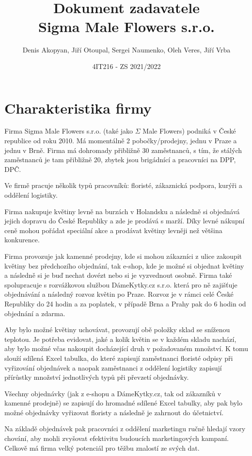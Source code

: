 \documentclass{article}
\title{Dokument zadavatele \\ Sigma Male Flowers s.r.o.}
\author{Denis Akopyan, Jiří Otoupal, Sergei Naumenko, Oleh Veres, Jiří Vrba}
\date{4IT216 - ZS 2021/2022}
\begin{document}
\maketitle
\clearpage

\section*{Charakteristika firmy}

Firma Sigma Male Flowers s.r.o. (také jako $\Sigma$ Male Flowers) podniká v České republice od roku 2010.
Má momentálně 2 pobočky/prodejny, jednu v Praze a jednu v Brně.
Firma má dohromady přibližně 30 zaměstnanců, s tím, že stálých zaměstnanců je tam přibližně 20, zbytek
jsou brigádnící a pracovníci na DPP, DPČ.

Ve firmě pracuje několik typů pracovníků: floristé, zákaznická podpora, kurýři a oddělení logistiky.

Firma nakupuje květiny levně na burzách v Holandsku a následně si objednává jejich dopravu do České Republiky a zde je prodává s marží. Díky levné nákupní ceně mohou pořádat speciální akce a prodávat květiny levněji než většina konkurence.

Firma provozuje jak kamenné prodejny, kde si mohou zákazníci z ulice zakoupit květiny bez předchozího objednání, tak e-shop, kde je možné si objednat květiny a následně si je buď nechat dovézt nebo si je vyzvednout osobně.
Firma také spolupracuje s rozvážkovou službou DámeKytky.cz s.r.o. která pro ně zajišťuje objednávání a následný rozvoz květin po Praze.
Rozvoz je v rámci celé České Republiky do 24 hodin a za poplatek, v případě Brna a Prahy pak do 6 hodin od objednání a zdarma.

Aby bylo možné květiny uchovávat, provozují obě položky sklad se sníženou teplotou.
Je potřeba evidovat, jaké a kolik květin se v každém skladu nachází, aby bylo možné včas nakoupit docházející druh v požadovaném množství.
K tomu slouží sdílená Excel tabulka, do které zapisují zaměstnanci floristé odpisy při vyřizování objednávek a naopak zaměstnanci z oddělení logistiky zapisují přírůstky množství jednotlivých typů při převzetí objednávky.

Všechny objednávky (jak z e-shopu a DámeKytky.cz, tak od zákazníků v kamenné prodejně) se zapisují do hromadné sdílené Excel tabulky, aby pak bylo možné objednávky vyřizovat floristy a následně je zahrnout do účetnictví.

Na základě objednávek pak pracovníci z oddělení marketingu ručně hledají vzory chování, aby mohli zvyšovat efektivitu budoucích marketingových kampaní. Celkově má firma velký potenciál pro těžbu znalostí ze svých dat.
\end{document}
